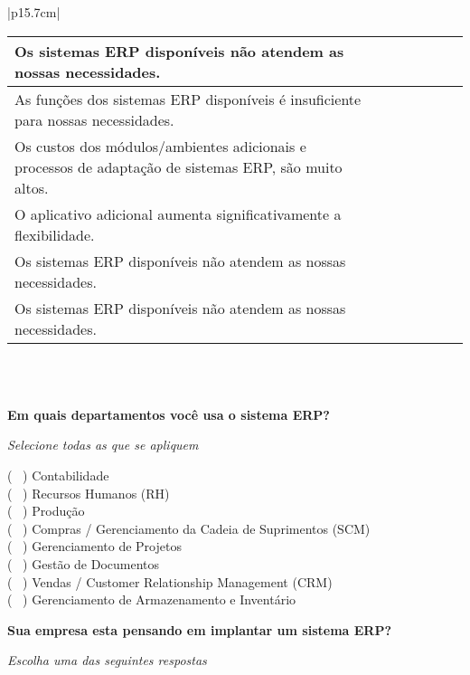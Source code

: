 \begin{longtable}{|p{15.7cm}|}
\begin{tabularx}{15.7 cm}{|X|X|X|X|X|X|X|}
		\hline
		Os sistemas ERP disponíveis não atendem as nossas necessidades. &   &   &   &   &   &  \\
		\hline
		As funções dos sistemas ERP disponíveis é insuficiente para nossas necessidades. &   &   &   &   &   &  \\
		\hline
		Os custos dos módulos/ambientes adicionais e processos de adaptação de sistemas ERP, são muito altos. &   &   &   &   &   &  \\
		\hline
		O aplicativo adicional aumenta significativamente a flexibilidade. &   &   &   &   &   &  \\
		\hline
		Os sistemas ERP disponíveis não atendem as nossas necessidades. &   &   &   &   &   &  \\
		\hline
		Os sistemas ERP disponíveis não atendem as nossas necessidades. &   &   &   &   &   &  \\
		\hline
	\end{tabularx}\\
	\\
	\begin{Spacing}{0.8} \end{Spacing}
	\begin{Spacing}{0.8} 
		\textbf{Em quais departamentos você usa o sistema ERP?} \end{Spacing} 
	\begin{Spacing}{2.0} 
		\tiny \textit{Selecione todas as que se apliquem} \end{Spacing} 
	( \ ) Contabilidade\\
	( \ ) Recursos Humanos (RH)\\
	( \ ) Produção\\
	( \ ) Compras / Gerenciamento da Cadeia de Suprimentos (SCM)\\
	( \ ) Gerenciamento de Projetos\\
	( \ ) Gestão de Documentos\\
	( \ ) Vendas / Customer Relationship Management (CRM)\\
	( \ ) Gerenciamento de Armazenamento e Inventário\\
	\begin{Spacing}{0.8} \end{Spacing}
	\begin{Spacing}{0.8} 
		\textbf{Sua empresa  esta pensando em implantar um sistema ERP?} \end{Spacing} 
	\begin{Spacing}{2.0} 
		\tiny \textit{Escolha uma das seguintes respostas} \end{Spacing} 

\end{longtable}
